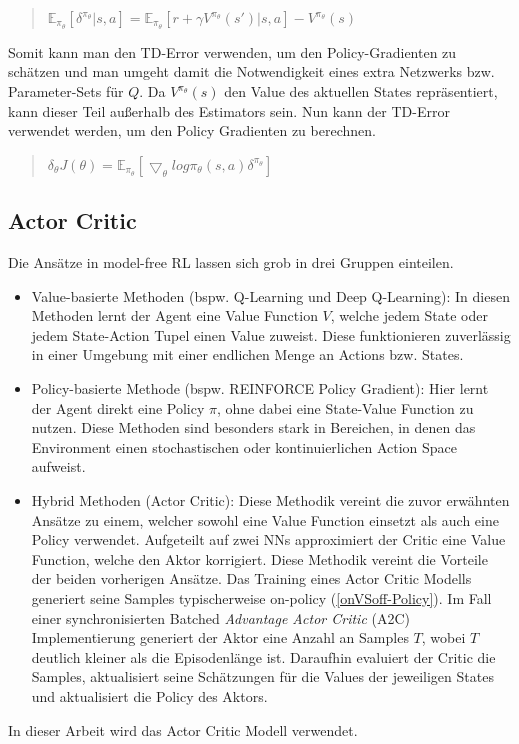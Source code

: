 \begin{quotation}
\centering
   \( \mathbb{E}_{\pi_{\theta}} [ \delta^{\pi_{\theta}} | s,a]  =  \mathbb{E}_{\pi_{\theta}} [ r + \gamma V^{\pi_{\theta}}(s') | s,a ] - V^{\pi_{\theta}}(s) \)
\end{quotation} 

Somit kann man den TD-Error verwenden, um den Policy-Gradienten zu schätzen und man umgeht damit die Notwendigkeit eines extra Netzwerks bzw. Parameter-Sets für $Q$. Da $V^{\pi_{\theta}}(s)$ den Value des aktuellen States repräsentiert, kann dieser Teil außerhalb des Estimators sein. Nun kann der TD-Error verwendet werden, um den Policy Gradienten zu berechnen.  

\begin{quotation}
\centering
   \(  \delta_{\theta}J(\theta)  =  \mathbb{E}_{\pi_{\theta}} [\bigtriangledown_{\theta} log \pi_{\theta}(s, a) \delta^{\pi_{\theta}}]  \)
\end{quotation}


\subsection{Actor Critic}\label{absch_RL_acModel}
Die Ansätze in model-free RL lassen sich grob in drei Gruppen einteilen.
  \begin{itemize}
  	\item Value-basierte Methoden (bspw. Q-Learning und Deep Q-Learning): In diesen Methoden lernt der Agent eine Value Function $V$, welche jedem State oder jedem State-Action Tupel einen Value zuweist. Diese funktionieren zuverlässig in einer Umgebung mit einer endlichen Menge an Actions bzw. States.
  	\item Policy-basierte Methode (bspw. REINFORCE Policy Gradient): Hier lernt der Agent direkt eine Policy $\pi$, ohne dabei eine State-Value Function zu nutzen. Diese Methoden sind besonders stark in Bereichen, in denen das Environment einen stochastischen oder kontinuierlichen Action Space aufweist.
  	\item Hybrid Methoden (Actor Critic): Diese Methodik vereint die zuvor erwähnten Ansätze zu einem, welcher sowohl eine Value Function einsetzt als auch eine Policy verwendet. Aufgeteilt auf zwei NNs approximiert der Critic eine Value Function, welche den Aktor korrigiert. Diese Methodik vereint die Vorteile der beiden vorherigen Ansätze. Das Training eines Actor Critic Modells generiert seine Samples typischerweise on-policy (\ref{onVSoff-Policy}). Im Fall einer synchronisierten Batched \emph{Advantage Actor Critic} (A2C) Implementierung generiert der Aktor eine Anzahl an Samples $T$, wobei $T$ deutlich kleiner als die Episodenlänge ist. Daraufhin evaluiert der Critic die Samples, aktualisiert seine Schätzungen für die Values der jeweiligen States und aktualisiert die Policy des Aktors.
  \end{itemize}
In dieser Arbeit wird das Actor Critic Modell verwendet. 


